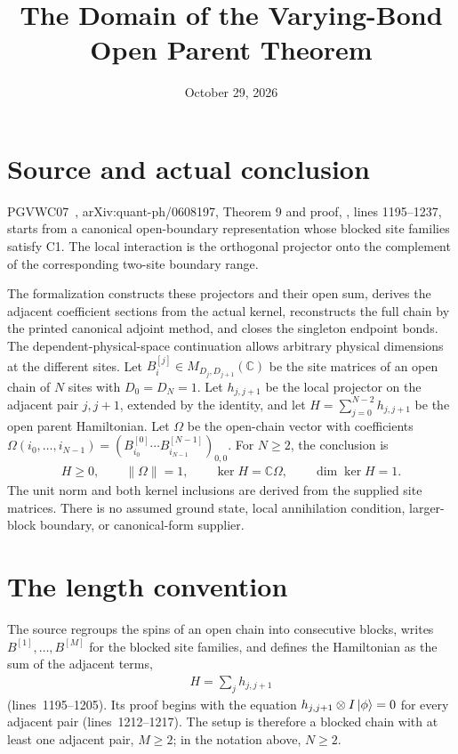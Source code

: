 \documentclass{article}
\title{The Domain of the Varying-Bond Open Parent Theorem}
\author{}
\date{October 29, 2026}
\begin{document}
\maketitle
{}

\section{Source and actual conclusion}
PGVWC07~\cite{PerezGarcia2007Matrix}, arXiv:quant-ph/0608197, Theorem 9 and proof,
, lines 1195--1237,
starts from a canonical open-boundary representation whose blocked site
families satisfy C1. The local interaction is the orthogonal projector
onto the complement of the corresponding two-site boundary range.

The formalization constructs these projectors and their open
sum, derives the adjacent coefficient sections from the actual kernel,
reconstructs the full chain by the printed canonical adjoint method,
and closes the singleton endpoint bonds. The dependent-physical-space
continuation allows arbitrary physical dimensions at the different sites.
Let $B^{[j]}_i\in M_{D_j,D_{j+1}}(\mathbb C)$ be the site matrices of an
open chain of $N$ sites with $D_0=D_N=1$. Let $h_{j,j+1}$ be the local
projector on the adjacent pair $j,j+1$, extended by the identity, and let
$H=\sum_{j=0}^{N-2}h_{j,j+1}$ be the open parent Hamiltonian. Let $\Omega$
be the open-chain vector with coefficients
$\Omega(i_0,\ldots,i_{N-1})=(B^{[0]}_{i_0}\cdots B^{[N-1]}_{i_{N-1}})_{0,0}$.
For $N\ge2$, the conclusion is
\begin{align}
    H\ge0,\qquad \|\Omega\|=1,\qquad
    \ker H=\mathbb C\Omega,\qquad \dim\ker H=1.
    \label{eq:pgvwc07_open_parent_domain_ground_state_line}
\end{align}
The unit norm and both kernel inclusions are derived from the supplied
site matrices. There is no assumed ground state, local annihilation
condition, larger-block boundary, or canonical-form supplier.

\section{The length convention}
The source regroups the spins of an open chain into consecutive blocks,
writes $B^{[1]},\ldots,B^{[M]}$ for the blocked site families, and defines
the Hamiltonian as the sum of the adjacent terms,
\begin{align}
    H=\sum_jh_{j,j+1}
    \label{eq:pgvwc07_open_parent_domain_source_hamiltonian}
\end{align}
(lines~1195--1205). Its proof begins with the equation
$h_{j,j+1}\otimes I\,|\phi\rangle=0$ for every adjacent pair
(lines~1212--1217). The setup is therefore a blocked chain with at least one
adjacent pair, $M\ge2$; in the notation above, $N\ge2$.
\end{document}

